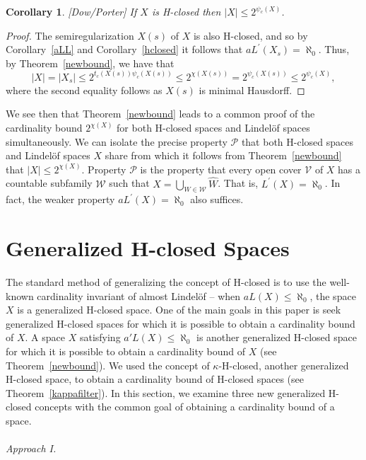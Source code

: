 \documentclass[11pt]{amsart}
\newif\ifdraft\draftfalse
\newtheorem{corollary}[theorem]{Corollary}
\theoremstyle{definition}
\theoremstyle{remark}
\numberwithin{equation}{section}
\begin{document}
\begin{corollary}{{\immediate{}}{\ifdraft\hspace{-\lastskip}\vadjust{\vspace{-1mm}\smash{\llap{{\tt {{dowporter}}}\hspace{8mm}}}\vspace{1mm}}\fi}}[Dow/Porter]
If $X$ is H-closed then $|X|\leq 2^{\psi_c(X)}$.
\end{corollary}
\begin{proof}
The semiregularization $X(s)$ of $X$ is also H-closed, and so by Corollary~\ref{aLL} and Corollary~\ref{hclosed} it follows that $aL^\prime(X_s)=\aleph_0$. Thus, by Theorem~\ref{newbound}, we have that $$|X|=|X_s|\leq 2^{t_c(X(s))\psi_c(X(s))}\leq 2^{\chi(X(s))}=2^{\psi_c(X(s))}\leq 2^{\psi_c(X)},$$
where the second equality follows as $X(s)$ is minimal Hausdorff.
\end{proof}

We see then that Theorem~\ref{newbound} leads to a common proof of the cardinality bound $2^{\chi(X)}$ for both H-closed spaces and Lindel\"of spaces simultaneously. We can isolate the precise property ${\ensuremath{\mathcal{{P}}}}$ that both H-closed spaces and Lindel\"of spaces $X$ share from which it follows from Theorem~\ref{newbound} that $|X|\leq 2^{\chi(X)}$. Property ${\ensuremath{\mathcal{{P}}}}$ is the property that every open cover ${\ensuremath{\mathcal{{V}}}}$ of $X$ has a countable subfamily ${\ensuremath{\mathcal{{W}}}}$ such that $X={\bigcup}_{W\in{\ensuremath{\mathcal{{W}}}}}\widehat{W}$. That is, $L^\prime(X)=\aleph_0$. In fact, the weaker property $aL^\prime(X)=\aleph_0$ also suffices.

\section{Generalized H-closed Spaces}

The standard method of generalizing the concept of  H-closed is to use the well-known cardinality invariant of almost Lindel\" of -- when  $aL(X) \leq \aleph_0$, the space $X$ is a generalized H-closed space.  One of the main goals in this paper is seek generalized H-closed spaces for which it is possible to obtain a cardinality bound of $X$. A space $X$ satisfying $a'L(X) \leq \aleph_0$ is another generalized H-closed space for which it is possible to obtain a cardinality bound of $X$ (see Theorem~\ref{newbound}).  We used the concept of $\kappa$-H-closed, another generalized H-closed space, to obtain a cardinality bound of H-closed spaces (see Theorem~\ref{kappafilter}).  In this section, we examine three new generalized H-closed concepts with the common goal of obtaining a cardinality bound of a space.\\\\
\emph{Approach I.}\\
\end{document}

